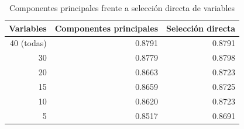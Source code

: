 \begin{table}[H]
\centering
\caption{Componentes principales frente a selección directa de variables}
\label{tab:reduccion}
\small
\begin{tabular}{r r r}
\toprule
\textbf{Variables} & \textbf{Componentes principales} & \textbf{Selección directa} \\
\midrule
40 (todas) & 0.8791 & 0.8791 \\
30 & 0.8779 & 0.8798 \\
20 & 0.8663 & 0.8723 \\
15 & 0.8659 & 0.8725 \\
10 & 0.8620 & 0.8723 \\
5 & 0.8517 & 0.8691 \\
\bottomrule
\end{tabular}
\end{table}
